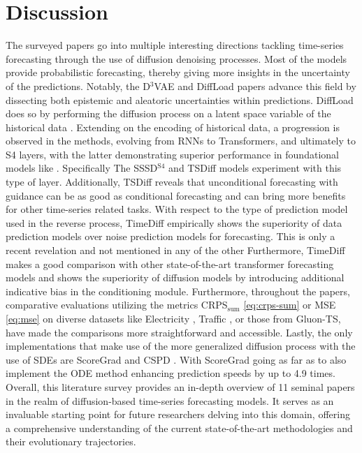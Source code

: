 \section{Discussion} \label{sec:discussion}
The surveyed papers go into multiple interesting directions tackling time-series forecasting through the use of diffusion denoising processes. Most of the models provide probabilistic forecasting, thereby giving more insights in the uncertainty of the predictions. Notably, the D$^3$VAE \cite{li_generative_2022} and DiffLoad \cite{wang_diffload_2023} papers advance this field by dissecting both epistemic and aleatoric uncertainties within predictions. DiffLoad does so by performing the diffusion process on a latent space variable of the historical data \cite{wang_diffload_2023}. Extending on the encoding of historical data, a progression is observed in the methods, evolving from RNNs to Transformers, and ultimately to S4 layers, with the latter demonstrating superior performance in foundational models like \cite{gu_mamba_2023}. Specifically The SSSD$^\text{S4}$ \cite{alcaraz_diffusion-based_2023} and TSDiff \cite{kollovieh_predict_2023} models experiment with this type of layer. Additionally, TSDiff reveals that unconditional forecasting with guidance can be as good as conditional forecasting and can bring more benefits for other time-series related tasks.
With respect to the type of prediction model used in the reverse process, TimeDiff \cite{shen_non-autoregressive_2023} empirically shows the superiority of data prediction models over noise prediction models for forecasting. This is only a recent revelation and not mentioned in any of the other  Furthermore, TimeDiff makes a good comparison with other state-of-the-art transformer forecasting models and shows the superiority of diffusion models by introducing additional indicative bias in the conditioning module. 
Furthermore, throughout the papers, comparative evaluations utilizing the metrics CRPS$_\text{sum}$ \eqref{eq:crps-sum} or MSE \eqref{eq:mse} on diverse datasets like Electricity \cite{trindade_electricityloaddiagrams20112014_2015}, Traffic \cite{cuturi_pems-sf_2011}, or those from Gluon-TS, have made the comparisons more straightforward and accessible.
Lastly, the only implementations that make use of the more generalized diffusion process with the use of SDEs are ScoreGrad \cite{yan_scoregrad_2021} and CSPD \cite{bilos_modeling_2022}. With ScoreGrad going as far as to also implement the ODE method enhancing prediction speeds by up to 4.9 times.
Overall, this literature survey provides an in-depth overview of 11 seminal papers in the realm of diffusion-based time-series forecasting models. It serves as an invaluable starting point for future researchers delving into this domain, offering a comprehensive understanding of the current state-of-the-art methodologies and their evolutionary trajectories.

